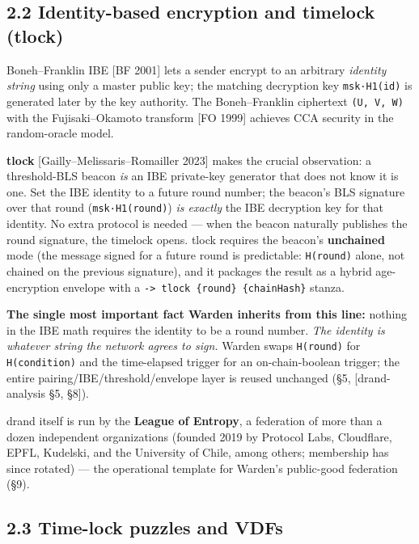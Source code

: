 \documentclass[
  11pt,
]{article}
\begin{document}
\subsection{2.2 Identity-based encryption and timelock
(tlock)}\label{identity-based-encryption-and-timelock-tlock}

Boneh--Franklin IBE {[}BF 2001{]} lets a sender encrypt to an arbitrary
\emph{identity string} using only a master public key; the matching
decryption key \texttt{msk·H1(id)} is generated later by the key
authority. The Boneh--Franklin ciphertext \texttt{(U,\ V,\ W)} with the
Fujisaki--Okamoto transform {[}FO 1999{]} achieves CCA security in the
random-oracle model.

\textbf{tlock} {[}Gailly--Melissaris--Romailler 2023{]} makes the
crucial observation: a threshold-BLS beacon \emph{is} an IBE private-key
generator that does not know it is one. Set the IBE identity to a future
round number; the beacon's BLS signature over that round
(\texttt{msk·H1(round)}) \emph{is exactly} the IBE decryption key for
that identity. No extra protocol is needed --- when the beacon naturally
publishes the round signature, the timelock opens. tlock requires the
beacon's \textbf{unchained} mode (the message signed for a future round
is predictable: \texttt{H(round)} alone, not chained on the previous
signature), and it packages the result as a hybrid age-encryption
envelope with a
\texttt{-\textgreater{}\ tlock\ \{round\}\ \{chainHash\}} stanza.

\textbf{The single most important fact Warden inherits from this line:}
nothing in the IBE math requires the identity to be a round number.
\emph{The identity is whatever string the network agrees to sign.}
Warden swaps \texttt{H(round)} for \texttt{H(condition)} and the
time-elapsed trigger for an on-chain-boolean trigger; the entire
pairing/IBE/threshold/envelope layer is reused unchanged (§5,
{[}drand-analysis §5, §8{]}).

drand itself is run by the \textbf{League of Entropy}, a federation of
more than a dozen independent organizations (founded 2019 by Protocol
Labs, Cloudflare, EPFL, Kudelski, and the University of Chile, among
others; membership has since rotated) --- the operational template for
Warden's public-good federation (§9).

\subsection{2.3 Time-lock puzzles and
VDFs}\label{time-lock-puzzles-and-vdfs}
\end{document}
